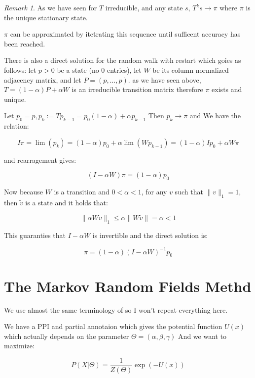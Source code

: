 \documentclass[a4paper,10pt]{article}
\newcommand{\lt}{<}
\theoremstyle{definition}
\theoremstyle{remark}
\newtheorem{remark}{Remark}
\theoremstyle{plain}
\begin{document}
\begin{remark}As we have seen for $T$ irreducible, and any state $s$, 
$T^ks \to \pi$ where $\pi$ is the unique stationary state.

$\pi$ can be approximated by itetrating this sequence until sufficent accuracy 
has been reached.

There is also a direct solution for the random walk with restart which goies as
follows: let $p > 0$ be a state (no $0$ entries), let $W$ be its
column-normalized adjacency matrix, and let $P = (p,\dots,p)$. as we have seen above,
$T = (1 - \alpha)P + \alpha W$ is an irreducible transition matrix
therefore $\pi$ exists and unique.

Let $p_0 = p, p_k := Tp_{k-1} = p_0(1-\alpha) + \alpha p_{k-1}$
Then $p_k \to \pi$ and 
We have the relation:

$$
I \pi = \lim(p_k) = (1 - \alpha)p_0 + \alpha \lim(W p_{k-1}) 
= (1-\alpha)I p_0 + \alpha W \pi
$$

and rearragement gives:

$$
(I - \alpha W)\pi = (1 - \alpha) p_0
$$

Now because $W$ is a transition and $0 < \alpha < 1$, for any $v$
such that $\|v\|_1 = 1$, then $\tilde{v}$ is a state and
it holds that:

$$
\|\alpha W v\|_1 \leq \alpha \|W \tilde{v}\| 
= \alpha \lt 1
$$

This guaranties that $I - \alpha W$ is invertible and
the direct solution is:


\[
\pi = (1 - \alpha) (I - \alpha W)^{-1} p_0
\]



\end{remark}

\section{The Markov Random Fields Methd}
We use almost the same terminology of \textcite{deng2002prediction}
so I won't repeat everything here.

We have a PPI and partial annotaion which gives the potential function $U(x)$
which actually depends on the parameter $\Theta =(\alpha, \beta, \gamma)$
And we want to maximize:

\begin{equation} \label{eq:gibbs_dist}
P(X | \Theta) = \frac{1}{Z(\Theta)}\exp(-U(x))
\end{equation}
\end{document}
